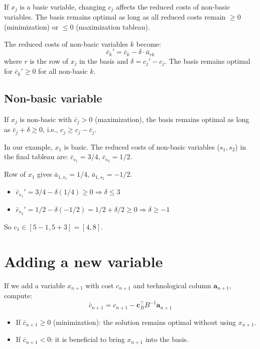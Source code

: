 If $x_j$ is a basic variable, changing $c_j$ affects the reduced costs of
non-basic variables.  The basis remains optimal as long as all reduced costs
remain $\ge 0$ (minimization) or $\le 0$ (maximization tableau).

\begin{keyformulas}[title=\textbf{Validity range for $c_j$ (basic variable)}]
The reduced costs of non-basic variables $k$ become:
\[
  \bar{c}_k' = \bar{c}_k - \delta \cdot \bar{a}_{rk}
\]
where $r$ is the row of $x_j$ in the basis and $\delta = c_j' - c_j$.
The basis remains optimal for $\bar{c}_k' \ge 0$ for all non-basic $k$.
\end{keyformulas}

\subsection{Non-basic variable}

If $x_j$ is non-basic with $\bar{c}_j > 0$ (maximization), the basis
remains optimal as long as $\bar{c}_j + \delta \ge 0$, i.e.,
$c_j \ge c_j - \bar{c}_j$.

\begin{example}[Variation of $c_1$]
In our example, $x_1$ is basic.  The reduced costs of non-basic variables
($s_1, s_2$) in the final tableau are:
$\bar{c}_{s_1} = 3/4$, $\bar{c}_{s_2} = 1/2$.

Row of $x_1$ gives $\bar{a}_{1,s_1} = 1/4$, $\bar{a}_{1,s_2} = -1/2$.

\begin{itemize}
  \item $\bar{c}_{s_1}' = 3/4 - \delta(1/4) \ge 0 \Rightarrow \delta \le 3$
  \item $\bar{c}_{s_2}' = 1/2 - \delta(-1/2) = 1/2 + \delta/2 \ge 0
        \Rightarrow \delta \ge -1$
\end{itemize}
So $c_1 \in [5-1, 5+3] = [4, 8]$.
\end{example}

\section{Adding a new variable}

If we add a variable $x_{n+1}$ with cost $c_{n+1}$ and technological column
$\mathbf{a}_{n+1}$, compute:
\[
  \bar{c}_{n+1} = c_{n+1} - \mathbf{c}_B^\top B^{-1} \mathbf{a}_{n+1}
\]

\begin{itemize}
  \item If $\bar{c}_{n+1} \ge 0$ (minimization): the solution remains
        optimal without using $x_{n+1}$.
  \item If $\bar{c}_{n+1} < 0$: it is beneficial to bring $x_{n+1}$ into
        the basis.
\end{itemize}

